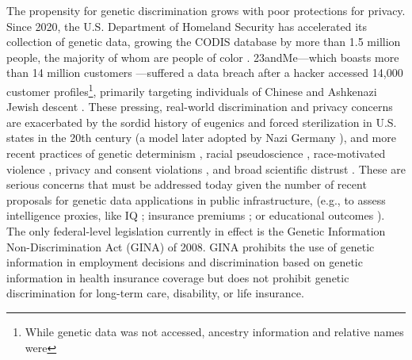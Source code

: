 The propensity for genetic discrimination grows with poor protections for privacy. Since 2020, the U.S. Department of Homeland Security has accelerated its collection of genetic data, growing the CODIS database by more than 1.5 million people, the majority of whom are people of color \cite{glaberson_raiding_2024}. 23andMe—which boasts more than 14 million customers \cite{23andme_reports_2023}—suffered a data breach after a hacker accessed 14,000 customer profiles\footnote{While genetic data was not accessed, ancestry information and relative names were\cite{23andme_addressing_2023}}, primarily targeting individuals of Chinese and Ashkenazi Jewish descent \cite{carballo_23andme_2024}. 
These pressing, real-world discrimination and privacy concerns are exacerbated by the sordid history of eugenics and forced sterilization in U.S. states in the 20th century (a model later adopted by Nazi Germany \cite{spiegel_jeremiah_2019}), and more recent practices of
genetic determinism \cite{epstein_is_2003}, racial pseudoscience \cite{lala_genes_2024, duello_race_2021, harmon_geneticists_2018, panofsky_how_2021}, race-motivated violence \cite{carlson_counter_2022}, privacy and consent violations \cite{strand_shedding_2016, sterling_genetic_2011, jillson_dna_2024}, and broad scientific distrust \cite{panacer_ethical_2023, kaye_tension_2012, saulsberry_need_2013}. These are serious concerns that must be addressed today given the number of recent proposals for genetic data applications in public infrastructure, (e.g., to assess intelligence proxies, like IQ \cite{r_new_2018}; insurance premiums \cite{karlsson_linner_genetic_2022}; or educational outcomes \cite{harden_genetic_2020}). The only federal-level legislation currently in effect is the Genetic Information Non-Discrimination Act (GINA) of 2008. GINA prohibits the use of genetic information in employment decisions and discrimination based on genetic information in health insurance coverage but does not 
prohibit genetic discrimination for long-term care, disability, or life insurance. 


